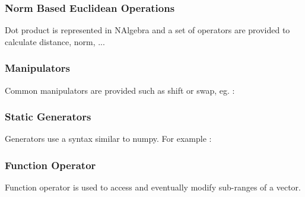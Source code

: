 \begin{DoxyCode}{0}
\end{DoxyCode}
\hypertarget{group___n_algebra_AlgcEucldOp}{}\subsubsection{Norm Based Euclidean Operations}\label{group___n_algebra_AlgcEucldOp}
Dot product is represented in {\ttfamily N\+Algebra} and a set of operators are provided to calculate distance, norm, ...


\begin{DoxyCode}{0}
\end{DoxyCode}
\hypertarget{group___n_algebra_ManipVec}{}\subsubsection{Manipulators}\label{group___n_algebra_ManipVec}
Common manipulators are provided such as {\ttfamily shift} or {\ttfamily swap}, eg. \+:


\begin{DoxyCode}{0}
\end{DoxyCode}
\hypertarget{group___n_algebra_StaticVec}{}\subsubsection{Static Generators}\label{group___n_algebra_StaticVec}
Generators use a syntax similar to numpy. For example \+:


\begin{DoxyCode}{0}
\end{DoxyCode}
\hypertarget{group___n_algebra_FuncOp}{}\subsubsection{Function Operator}\label{group___n_algebra_FuncOp}
Function operator is used to access and eventually modify sub-\/ranges of a vector.


